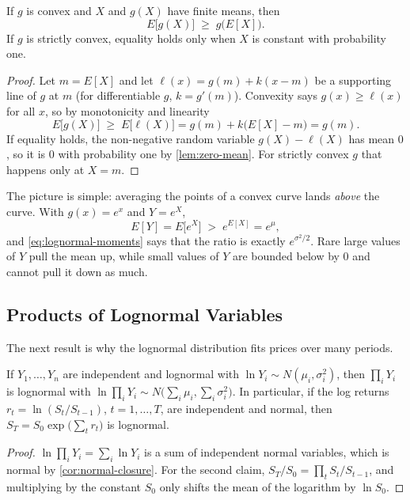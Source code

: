 \begin{theorem}\label{thm:jensen}
	If $g$ is convex and $X$ and $g(X)$ have finite means, then
	\[
		E\bigl[g(X)\bigr] \;\ge\; g\bigl(E[X]\bigr) .
	\]
	If $g$ is strictly convex, equality holds only when $X$ is constant with probability one.
\end{theorem}

\begin{proof}
	Let $m=E[X]$ and let $\ell(x)=g(m)+k(x-m)$ be a supporting line of $g$ at $m$ (for differentiable $g$, $k=g'(m)$).
	Convexity says $g(x)\ge\ell(x)$ for all $x$, so by monotonicity and linearity
	\[
		E\bigl[g(X)\bigr]\;\ge\;E\bigl[\ell(X)\bigr]=g(m)+k\bigl(E[X]-m\bigr)=g(m) .
	\]
	If equality holds, the non-negative random variable $g(X)-\ell(X)$ has mean $0$, so it is $0$ with probability one by \autoref{lem:zero-mean}.
	For strictly convex $g$ that happens only at $X=m$.
\end{proof}

The picture is simple: averaging the points of a convex curve lands \emph{above} the curve.
With $g(x)=e^{x}$ and $Y=e^{X}$,
\[
	E[Y]=E\bigl[e^{X}\bigr]\;>\;e^{E[X]}=e^{\mu} ,
\]
and \eqref{eq:lognormal-moments} says that the ratio is exactly $e^{\sigma^{2}/2}$.
Rare large values of $Y$ pull the mean up, while small values of $Y$ are bounded below by $0$ and cannot pull it down as much.

\subsection{Products of Lognormal Variables}

The next result is why the lognormal distribution fits prices over many periods.

\begin{proposition}\label{prop:lognormal-product}
	If $Y_{1},\dots,Y_{n}$ are independent and lognormal with $\ln Y_{i}\sim N(\mu_{i},\sigma_{i}^{2})$, then $\prod_{i}Y_{i}$ is lognormal with $\ln\prod_{i}Y_{i}\sim N\bigl(\sum_{i}\mu_{i},\sum_{i}\sigma_{i}^{2}\bigr)$.
	In particular, if the log returns $r_{t}=\ln(S_{t}/S_{t-1})$, $t=1,\dots,T$, are independent and normal, then $S_{T}=S_{0}\exp\bigl(\sum_{t}r_{t}\bigr)$ is lognormal.
\end{proposition}

\begin{proof}
	$\ln\prod_{i}Y_{i}=\sum_{i}\ln Y_{i}$ is a sum of independent normal variables, which is normal by \autoref{cor:normal-closure}.
	For the second claim, $S_{T}/S_{0}=\prod_{t}S_{t}/S_{t-1}$, and multiplying by the constant $S_{0}$ only shifts the mean of the logarithm by $\ln S_{0}$.
\end{proof}

